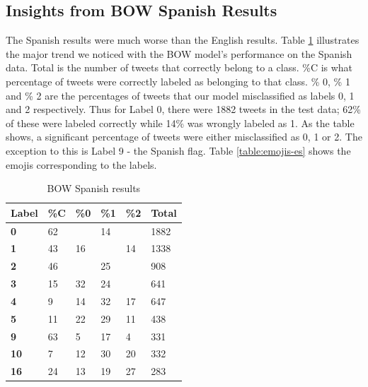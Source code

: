 \documentclass[11pt,a4paper]{article}
\begin{document}
\subsection{Insights from BOW Spanish Results}
The Spanish results were much worse than the English results. Table \ref{table:results-es} illustrates the major trend we noticed with the BOW model's performance on the Spanish data. Total is the number of tweets that correctly belong to a class. \%C is what percentage of tweets were correctly labeled as belonging to that class. \% 0, \% 1 and \% 2 are the percentages of tweets that our model misclassified as labels 0, 1 and 2 respectively. Thus for Label 0, there were 1882 tweets in the test data; 62\% of these were labeled correctly while 14\% was wrongly labeled as 1. As the table shows, a significant percentage of tweets were either misclassified as 0, 1 or 2. The exception to this is Label 9 - the Spanish flag. Table \ref{table:emojis-es} shows the emojis corresponding to the labels. 

\begin{table}[]
\centering
\begin{tabular}{llllll}
\hline
\textbf{Label} & \textbf{\%C} & \textbf{\%0} & \textbf{\%1} & \textbf{\%2} & \textbf{Total} \\ \hline
\textbf{0} & 62 &  & 14 &  & 1882 \\ \hline
\textbf{1} & 43 & 16 &  & 14 & 1338 \\ \hline
\textbf{2} & 46 &  & 25 &  & 908 \\ \hline
\textbf{3} & 15 & 32 & 24 &  & 641 \\ \hline
\textbf{4} & 9 & 14 & 32 & 17 & 647 \\ \hline
\textbf{5} & 11 & 22 & 29 & 11 & 438 \\ \hline
\textbf{9} & 63 & 5 & 17 & 4 & 331 \\ \hline
\textbf{10} & 7 & 12 & 30 & 20 & 332 \\ \hline
\textbf{16} & 24 & 13 & 19 & 27 & 283 \\ \hline
\end{tabular}
\caption{BOW Spanish results}
\label{table:results-es}
\end{table}
\end{document}
